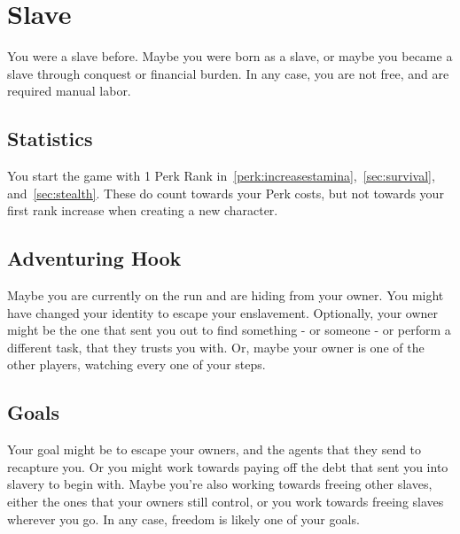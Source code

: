 \section{Slave}\label{background:slave}
You were a slave before. 
Maybe you were born as a slave, or maybe you became a slave through conquest or financial burden.
In any case, you are not free, and are required manual labor.

\subsection{Statistics}
You start the game with 1 Perk Rank in~\ref{perk:increasestamina},~\ref{sec:survival}, and~\ref{sec:stealth}.
These do count towards your Perk costs, but not towards your first rank increase when creating a new character.

\subsection{Adventuring Hook}
Maybe you are currently on the run and are hiding from your owner.
You might have changed your identity to escape your enslavement.
Optionally, your owner might be the one that sent you out to find something -  or someone - or perform a different task, that they trusts you with.
Or, maybe your owner is one of the other players, watching every one of your steps.

\subsection{Goals}
Your goal might be to escape your owners, and the agents that they send to recapture you.
Or you might work towards paying off the debt that sent you into slavery to begin with.
Maybe you're also working towards freeing other slaves, either the ones that your owners still control, or you work towards freeing slaves wherever you go.
In any case, freedom is likely one of your goals.